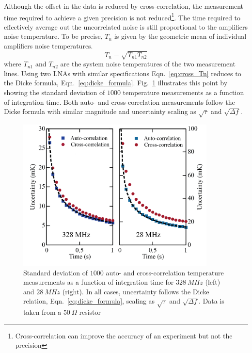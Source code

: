 Although the offset in the data is reduced by cross-correlation, the measurement time required to achieve a given precision is not reduced\footnote{Cross-correlation can improve the accuracy of an experiment but not the precision}. The time required to effectively average out the uncorrelated noise is still proportional to the amplifiers noise temperature. To be precise, $T_n$ is given by the geometric mean of individual amplifiers noise temperatures.
\begin{equation}\label{eq:cross_Tn}
T_n = \sqrt{T_{n1}T_{n2}}
\end{equation}
where $T_{n1}$ and $T_{n2}$ are the system noise temperatures of the two measurement lines. Using two LNAs with similar specifications Eqn.~\ref{eq:cross_Tn} reduces to the Dicke formula, Eqn.~\ref{eq:dicke_formula}. Fig.~\ref{fig:cross_sensitivity} illustrates this point by showing the standard deviation of $1000$ temperature measurements as a function of integration time. Both auto- and cross-correlation measurements follow the Dicke formula with similar magnitude and uncertainty scaling as $\sqrt{\tau}$ and $\sqrt{\Delta f}$.
\begin{figure}
\centering
\includegraphics[width = 100mm]{figures/Johnson_noise_thermometry/cross_sensitivity.png}
\caption{Standard deviation of $1000$ auto- and cross-correlation temperature measurements as a function of integration time for $328~MHz$ (left) and $28~MHz$ (right). In all cases, uncertainty follows the Dicke relation, Eqn.~\ref{eq:dicke_formula}, scaling as $\sqrt{\tau}$ and $\sqrt{\Delta f}$. Data is taken from a $50~\Omega$ resistor}
\label{fig:cross_sensitivity}
\end{figure}
 

